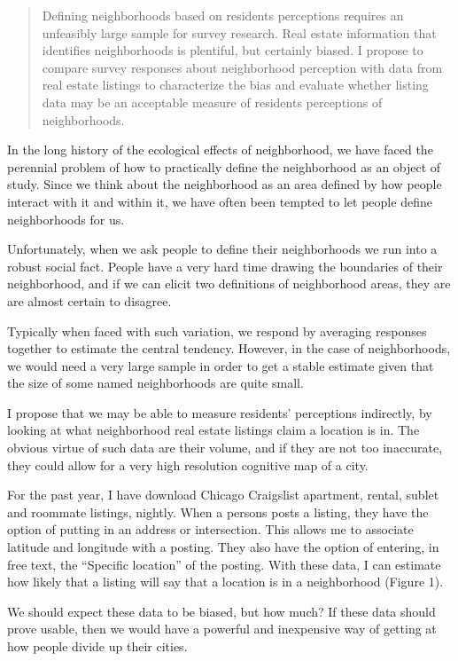 \documentclass[11pt,letterpaper,oneside]{article}
\begin{document}
\begin{abstract}
Defining neighborhoods based on residents perceptions requires an
unfeasibly large sample for survey research. Real estate information
that identifies neighborhoods is plentiful, but certainly biased. I
propose to compare survey responses about neighborhood perception with
data from real estate listings to characterize the bias and evaluate
whether listing data may be an acceptable measure of residents
perceptions of neighborhoods.
\end{abstract}

In the long history of the ecological effects of neighborhood, we have
faced the perennial problem of how to practically define the
neighborhood as an object of study. Since we think about the
neighborhood as an area defined by how people interact with it and
within it, we have often been tempted to let people define
neighborhoods for us.

Unfortunately, when we ask people to define their neighborhoods we run
into a robust social fact. People have a very hard time drawing the
boundaries of their neighborhood, and if we can elicit two definitions
of neighborhood areas, they are are almost certain to disagree.

Typically when faced with such variation, we respond by averaging
responses together to estimate the central tendency. However, in the
case of neighborhoods, we would need a very large sample in order to
get a stable estimate given that the size of some named neighborhoods
are quite small.

I propose that we may be able to measure residents’ perceptions
indirectly, by looking at what neighborhood real estate listings claim
a location is in. The obvious virtue of such data are their volume,
and if they are not too inaccurate, they could allow for a very high
resolution cognitive map of a city.

For the past year, I have download Chicago Craigslist apartment,
rental, sublet and roommate listings, nightly. When a persons posts a
listing, they have the option of putting in an address or
intersection. This allows me to associate latitude and longitude with
a posting. They also have the option of entering, in free text, the
“Specific location” of the posting.  With these data, I can estimate
how likely that a listing will say that a location is in a
neighborhood (Figure 1).

We should expect these data to be biased, but how much? If these data
should prove usable, then we would have a powerful and inexpensive way
of getting at how people divide up their cities.
\end{document}
